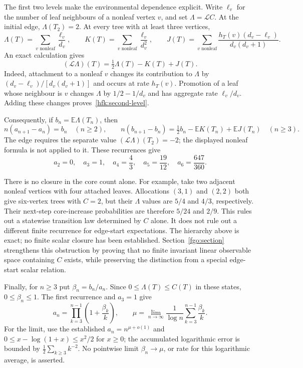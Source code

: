 The first two levels make the environmental dependence explicit.
Write $\ell_v$ for the number of leaf neighbours of a nonleaf vertex
$v$, and set $\Lambda=\mathcal LC$. At the initial edge,
$\Lambda(T_2)=2$. At every tree with at least three vertices,
\[
 \Lambda(T)=\sum_{v\text{ nonleaf}}\frac{\ell_v}{d_v},\qquad
 K(T)=\sum_{v\text{ nonleaf}}\frac{\ell_v}{d_v^2},\qquad
 J(T)=\sum_{v\text{ nonleaf}}
          \frac{h_T(v)(d_v-\ell_v)}{d_v(d_v+1)}.
\]
An exact calculation gives
\begin{equation}\label{hfk:second-level}
 (\mathcal L\Lambda)(T)=\tfrac12\Lambda(T)-K(T)+J(T).
\end{equation}
Indeed, attachment to a nonleaf $v$ changes its contribution to
$\Lambda$ by $(d_v-\ell_v)/[d_v(d_v+1)]$ and occurs at rate
$h_T(v)$. Promotion of a leaf whose neighbour is $v$ changes
$\Lambda$ by $1/2-1/d_v$ and has aggregate rate $\ell_v/d_v$.
Adding these changes proves~\eqref{hfk:second-level}.

Consequently, if $b_n=\mathbb E\Lambda(T_n)$, then
\[
 n(a_{n+1}-a_n)=b_n\quad(n\ge2),\qquad
 n(b_{n+1}-b_n)=\tfrac12b_n-\mathbb EK(T_n)+\mathbb EJ(T_n)
 \quad(n\ge3).
\]
The edge requires the separate value
$(\mathcal L\Lambda)(T_2)=-2$; the displayed nonleaf formula is
not applied to it. These recurrences give
\[
 a_2=0,\quad a_3=1,\quad a_4=\frac43,\quad
 a_5=\frac{19}{12},\quad a_6=\frac{647}{360}.
\]

There is no closure in the core count alone. For example, take two
adjacent nonleaf vertices with four attached leaves. Allocations
$(3,1)$ and $(2,2)$ both give six-vertex trees with $C=2$, but their
$\Lambda$ values are $5/4$ and $4/3$, respectively. Their next-step
core-increase probabilities are therefore $5/24$ and $2/9$.
This rules out a statewise transition law determined by $C$ alone.
It does not rule out a different finite recurrence for edge-start
expectations. The hierarchy above is exact; no finite scalar closure
has been established.
Section~\ref{fgo:section} strengthens this obstruction by proving that
no finite invariant linear observable space containing $C$ exists,
while preserving the distinction from a special edge-start scalar relation.

Finally, for $n\ge3$ put $\beta_n=b_n/a_n$. Since
$0\le\Lambda(T)\le C(T)$ in these states, $0\le\beta_n\le1$.
The first recurrence and $a_3=1$ give
\begin{equation}\label{hfk:logarithmic-average}
 a_n=\prod_{k=3}^{n-1}\left(1+\frac{\beta_k}{k}\right),
 \qquad
 \mu=\lim_{n\to\infty}\frac1{\log n}
                  \sum_{k=3}^{n-1}\frac{\beta_k}{k}.
\end{equation}
For the limit, use the established $a_n=n^{\mu+o(1)}$ and
$0\le x-\log(1+x)\le x^2/2$ for $x\ge0$; the accumulated
logarithmic error is bounded by $\tfrac12\sum_{k\ge3}k^{-2}$.
No pointwise limit $\beta_n\to\mu$, or rate for this logarithmic
average, is asserted.

